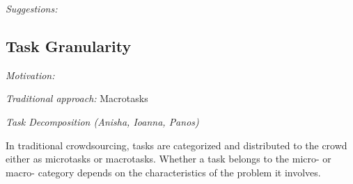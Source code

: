 \documentclass[10pt,twocolumn,letterpaper]{article}
\begin{document}
\emph{Suggestions:}



\subsection{Task Granularity}
\emph{Motivation:} 

\emph{Traditional approach:}
Macrotasks\cite{Haas2015}

\emph{Task Decomposition (Anisha, Ioanna, Panos)} 

In traditional crowdsourcing, tasks are categorized and distributed to the crowd either as microtasks or macrotasks. Whether a task belongs to the micro- or macro- category depends on the characteristics of the problem it involves. 
\end{document}
